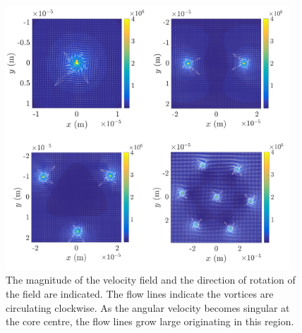 \begin{figure}\centering
    \includegraphics[width=0.95\textwidth]{Images/ch4_vtx/velocity/velocity.pdf}
    \caption{The magnitude of the velocity field and the direction of rotation of the field are indicated. The flow lines indicate the vortices are circulating clockwise. As the angular velocity becomes singular at the core centre, the flow lines grow large originating in this region.}
    \label{fig:vel_field}
\end{figure}

